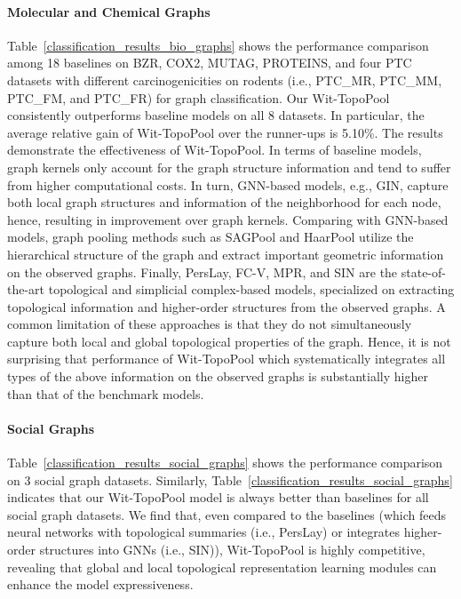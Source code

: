 \documentclass[letterpaper]{article} %
\begin{document}
\paragraph{Molecular and Chemical Graphs} Table~\ref{classification_results_bio_graphs} shows the performance comparison among 18 baselines on BZR, COX2, MUTAG, PROTEINS, and four PTC datasets with different carcinogenicities on rodents (i.e., PTC\_MR, PTC\_MM, PTC\_FM, and PTC\_FR) for graph classification. Our Wit-TopoPool consistently outperforms baseline models on all 8 datasets. In particular, the average relative gain of Wit-TopoPool over the runner-ups is 5.10\%. The results demonstrate the effectiveness of Wit-TopoPool. In terms of baseline models, graph kernels only account for the graph structure information and tend to suffer from higher computational costs. In turn, GNN-based models, e.g., GIN, capture both local graph structures and information of the neighborhood for each node, hence, resulting in improvement over graph kernels. Comparing with GNN-based models, graph pooling methods such as SAGPool and HaarPool utilize the hierarchical structure of the graph and extract important geometric information on the observed graphs. Finally, PersLay, FC-V, MPR, and SIN are the state-of-the-art topological and simplicial complex-based models, specialized on extracting topological information and higher-order structures from the observed graphs. A common limitation of these approaches is that they do not simultaneously capture both local and global topological properties of the graph. Hence, it is not surprising that performance of Wit-TopoPool which systematically integrates all types of the above information on the observed graphs is substantially higher than that of the benchmark models.  


\paragraph{Social Graphs} Table~\ref{classification_results_social_graphs} shows the performance comparison on 3 social graph datasets. Similarly, Table~\ref{classification_results_social_graphs} indicates that our Wit-TopoPool model is always better than baselines for all social graph datasets. We find that, even compared to the baselines (which feeds neural networks with topological summaries (i.e., PersLay) or integrates higher-order structures into GNNs (i.e., SIN)), Wit-TopoPool is highly competitive, revealing that global and local topological representation learning modules can enhance the model expressiveness.
\end{document}
